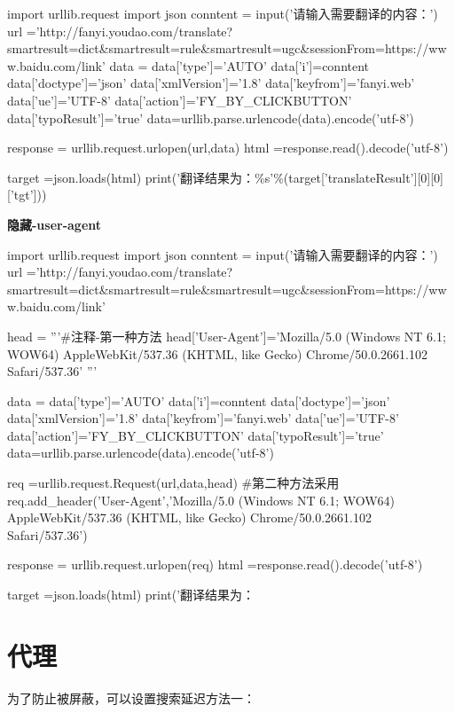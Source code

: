 \documentclass[a4paper,10pt]{ctexart}
\begin{document}
\begin{python}

import urllib.request
import json
conntent = input('请输入需要翻译的内容：')
url ='http://fanyi.youdao.com/translate?smartresult=dict&smartresult=rule&smartresult=ugc&sessionFrom=https://www.baidu.com/link'
data = {}
data['type']='AUTO'
data['i']=conntent
data['doctype']='json'
data['xmlVersion']='1.8'
data['keyfrom']='fanyi.web'
data['ue']='UTF-8'
data['action']='FY_BY_CLICKBUTTON'
data['typoResult']='true'
data=urllib.parse.urlencode(data).encode('utf-8')

response = urllib.request.urlopen(url,data)
html =response.read().decode('utf-8')

target =json.loads(html)
print('翻译结果为：\%s'\%(target['translateResult'][0][0]['tgt']))

\end{python}

\textbf{隐藏-user-agent}\\

\begin{python}
import urllib.request
import json
conntent = input('请输入需要翻译的内容：')
url ='http://fanyi.youdao.com/translate?smartresult=dict&smartresult=rule&smartresult=ugc&sessionFrom=https://www.baidu.com/link'


head ={}
'''#注释-第一种方法
head['User-Agent']='Mozilla/5.0 (Windows NT 6.1; WOW64) AppleWebKit/537.36 (KHTML, like Gecko) Chrome/50.0.2661.102 Safari/537.36'
'''

data = {}
data['type']='AUTO'
data['i']=conntent
data['doctype']='json'
data['xmlVersion']='1.8'
data['keyfrom']='fanyi.web'
data['ue']='UTF-8'
data['action']='FY_BY_CLICKBUTTON'
data['typoResult']='true'
data=urllib.parse.urlencode(data).encode('utf-8')

req =urllib.request.Request(url,data,head)
#第二种方法采用
req.add_header('User-Agent','Mozilla/5.0 (Windows NT 6.1; WOW64) AppleWebKit/537.36 (KHTML, like Gecko) Chrome/50.0.2661.102 Safari/537.36')

response = urllib.request.urlopen(req)
html =response.read().decode('utf-8')


target =json.loads(html)
print('翻译结果为：%
\end{python}

\section{代理}
为了防止被屏蔽，可以设置搜索延迟方法一：
\end{document}
